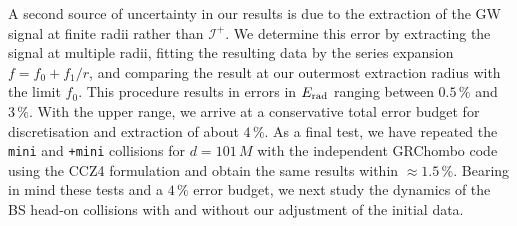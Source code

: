 \documentclass[]{iopart}
\begin{document}
A second source of uncertainty in our results is due
to the extraction of the GW signal at finite radii
rather than $\mathcal{I}^+$. We determine this error
by extracting the signal at multiple radii, fitting
the resulting data by the series expansion
$f=f_0+f_1/r$, and comparing the result at our outermost
extraction radius with the limit $f_0$. This procedure
results in errors in $E_{\rm rad}$ ranging between $0.5\,\%$
and $3\,\%$. With the upper range, we arrive at
a conservative total error budget for discretisation and
extraction of about $4\,\%$.
As a final test, we have repeated the {\tt mini} and
{\tt +mini} collisions for $d=101\,M$
with the independent {\sc GRChombo}
code \cite{Clough:2015sqa,Radia:2021} using the CCZ4 formulation \cite{Alic:2011gg} and obtain the same results within $\approx 1.5\,\%$.
Bearing in mind these tests and a $4\,\%$ error budget,
we next study the dynamics of the BS head-on collisions
with and without our adjustment of the initial data.


\end{document}
